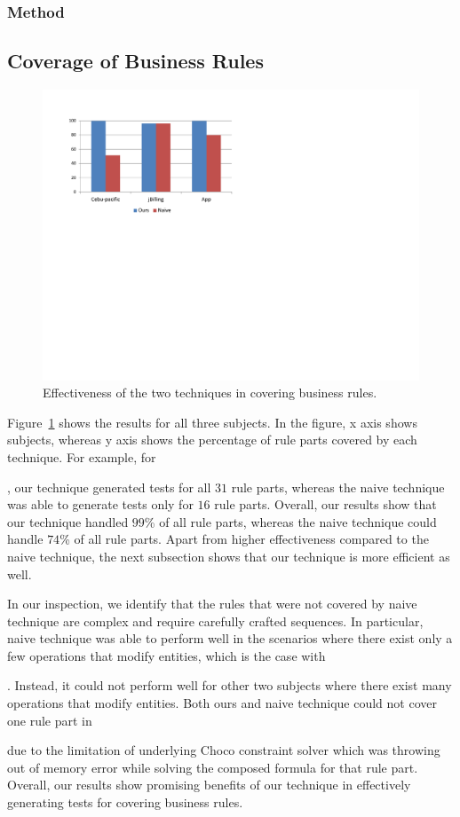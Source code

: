 \subsubsection{Method}


\subsection{Coverage of Business Rules}

\begin{figure}[t]
\centering
\includegraphics[width=\columnwidth, clip, trim = 18mm 120mm 140mm
  18mm]{Figs/Study-1.pdf}
\caption{Effectiveness of the two techniques in covering business rules.}
\label{fig:effectiveness}
\end{figure}

Figure~\ref{fig:effectiveness} shows the results for all three subjects. 
In the figure, x axis shows subjects, whereas y axis shows the percentage of rule parts
covered by each technique. For example, for \subject{Cebu-pacific},
our technique generated tests for all $31$ rule parts, whereas the naive technique was able
to generate tests only for $16$ rule parts. Overall, our results show 
that our technique handled $99$\% of all rule parts, whereas the naive technique
could handle $74$\% of all rule parts. Apart from higher effectiveness compared
to the naive technique, the next subsection shows that our technique is more efficient
as well.

In our inspection, we identify that the rules that were not covered by naive technique
are complex and require carefully crafted sequences. In particular, naive technique
was able to perform well in the scenarios where there exist only a few operations
that modify entities, which is the case with \subject{jBilling}. Instead, it could not
perform well for other two subjects where there exist many operations that modify
entities. Both ours and naive technique could not cover one rule part in \subject{jBilling}
due to the limitation of underlying Choco constraint solver which was throwing 
out of memory error while solving the composed formula for that rule part. Overall,
our results show promising benefits of our technique in effectively generating
tests for covering business rules.

